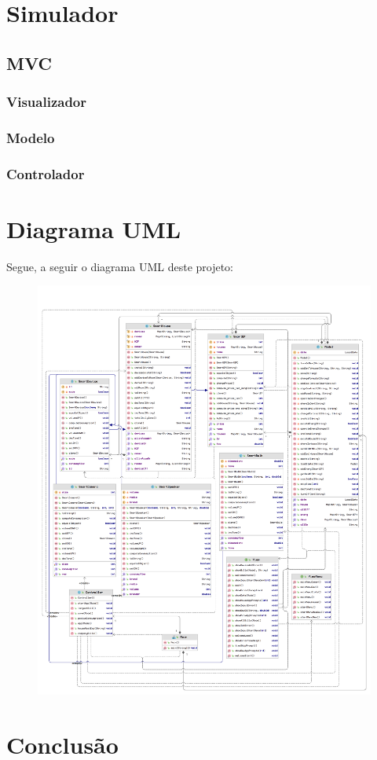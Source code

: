 \documentclass[10pt, a4paper]{article}
\begin{document}
\section{Simulador}
\lipsum[1]
\subsection{MVC}
\lipsum[1]
\subsubsection{Visualizador}
\lipsum[1]
\subsubsection{Modelo}
\lipsum[2]
\subsubsection{Controlador}
\lipsum[2]
\section{Diagrama UML}
Segue, a seguir o diagrama UML deste projeto:
\begin{figure}
        \centering
        \includegraphics[width=\textwidth]{diagram_1.png}
\end{figure}

\newpage
\section{Conclusão}
\lipsum[1-2]
\end{document}
